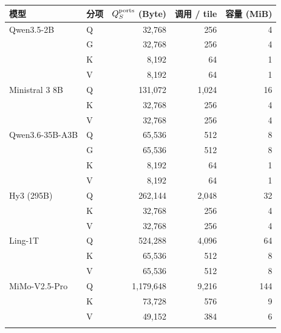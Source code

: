 \begin{tabular}{@{}llrrr@{}}\toprule
模型 & 分项 & $Q_S^{\rm ports}$ (Byte) & 调用 / tile & 容量 (MiB)\\\midrule
Qwen3.5-2B & Q & 32,768 & 256 & 4\\
 & G & 32,768 & 256 & 4\\
 & K & 8,192 & 64 & 1\\
 & V & 8,192 & 64 & 1\\
\addlinespace[3pt]
Ministral 3 8B & Q & 131,072 & 1,024 & 16\\
 & K & 32,768 & 256 & 4\\
 & V & 32,768 & 256 & 4\\
\addlinespace[3pt]
Qwen3.6-35B-A3B & Q & 65,536 & 512 & 8\\
 & G & 65,536 & 512 & 8\\
 & K & 8,192 & 64 & 1\\
 & V & 8,192 & 64 & 1\\
\addlinespace[3pt]
Hy3 (295B) & Q & 262,144 & 2,048 & 32\\
 & K & 32,768 & 256 & 4\\
 & V & 32,768 & 256 & 4\\
\addlinespace[3pt]
Ling-1T & Q & 524,288 & 4,096 & 64\\
 & K & 65,536 & 512 & 8\\
 & V & 65,536 & 512 & 8\\
\addlinespace[3pt]
MiMo-V2.5-Pro & Q & 1,179,648 & 9,216 & 144\\
 & K & 73,728 & 576 & 9\\
 & V & 49,152 & 384 & 6\\
\addlinespace[3pt]
\bottomrule\end{tabular}
